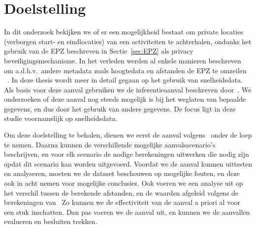 \section{Doelstelling}
In dit onderzoek bekijken we of er een mogelijkheid bestaat om private locaties
(verborgen start- en eindlocaties) van een activiteiten te achterhalen, ondanks
het gebruik van de \ac{EPZ} beschreven in Sectie~\ref{sec:EPZ} als privacy
beveiligingsmechanisme. In het verleden werden al enkele manieren beschreven om
a.d.h.v.\ andere metadata zoals hoogtedata en afstanden de \ac{EPZ} te omzeilen
~\cite{Verdonck_2022, Dhondt, sec18has3:online}. In deze thesis wordt meer in
detail gegaan op het gebruik van snelheidsdata. Als basis voor deze aanval
gebruiken we de inferentieaanval beschreven door~\citeauthor{Dhondt}. We
onderzoeken of deze aanval nog steeds mogelijk is bij het weglaten van bepaalde
gegevens, en dus door het gebruik van andere gegevens. De focus ligt in deze
studie voornamelijk op snelheidsdata.

Om deze doelstelling te behalen, dienen we eerst de aanval
volgens~\citeauthor{Dhondt} onder de loep te nemen. Daarna kunnen de
verschillende mogelijke aanvalsscenario's beschrijven, en voor elk scenario de
nodige berekeningen uitwerken die nodig zijn opdat dit scenario kan worden
uitgevoerd. Voordat we de aanval kunnen uittesten en analyseren, moeten we de
dataset beschouwen op mogelijke fouten, en deze ook in acht nemen voor
mogelijke conclusies. Ook voeren we een analyse uit op het verschil tussen de
berekende afstanden, en de waarden afgeleid volgens de berekeningen
van~\citeauthor{Dhondt} Zo kunnen we de effectiviteit van de aanval a priori al
voor een stuk inschatten. Dan pas voeren we de aanval uit, en kunnen we de
aanvallen evalueren en besluiten trekken.

